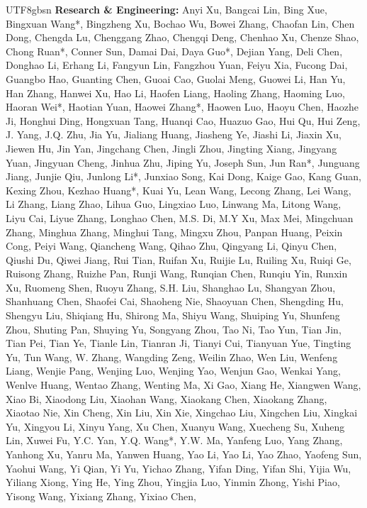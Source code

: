 \documentclass[11pt, a4paper, logo, copyright, nonumbering]{deepseek}
\begin{document}
\begin{CJK*}{UTF8}{gbsn}
\noindent
\textbf{Research \& Engineering:} 
Anyi Xu,
Bangcai Lin,
Bing Xue,
Bingxuan Wang*,
Bingzheng Xu,
Bochao Wu,
Bowei Zhang,
Chaofan Lin,
Chen Dong,
Chengda Lu,
Chenggang Zhao,
Chengqi Deng,
Chenhao Xu,
Chenze Shao,
Chong Ruan*,
Conner Sun,
Damai Dai,
Daya Guo*,
Dejian Yang,
Deli Chen,
Donghao Li,
Erhang Li,
Fangyun Lin,
Fangzhou Yuan,
Feiyu Xia,
Fucong Dai,
Guangbo Hao,
Guanting Chen,
Guoai Cao,
Guolai Meng,
Guowei Li,
Han Yu,
Han Zhang,
Hanwei Xu,
Hao Li,
Haofen Liang,
Haoling Zhang,
Haoming Luo,
Haoran Wei*,
Haotian Yuan,
Haowei Zhang*,
Haowen Luo,
Haoyu Chen,
Haozhe Ji,
Honghui Ding,
Hongxuan Tang,
Huanqi Cao,
Huazuo Gao,
Hui Qu,
Hui Zeng,
J. Yang,
J.Q. Zhu,
Jia Yu,
Jialiang Huang,
Jiasheng Ye,
Jiashi Li,
Jiaxin Xu,
Jiewen Hu,
Jin Yan,
Jingchang Chen,
Jingli Zhou,
Jingting Xiang,
Jingyang Yuan,
Jingyuan Cheng,
Jinhua Zhu,
Jiping Yu,
Joseph Sun,
Jun Ran*,
Junguang Jiang,
Junjie Qiu,
Junlong Li*,
Junxiao Song,
Kai Dong,
Kaige Gao,
Kang Guan,
Kexing Zhou,
Kezhao Huang*,
Kuai Yu,
Lean Wang,
Lecong Zhang,
Lei Wang,
Li Zhang,
Liang Zhao,
Lihua Guo,
Lingxiao Luo,
Linwang Ma,
Litong Wang,
Liyu Cai,
Liyue Zhang,
Longhao Chen,
M.S. Di,
M.Y Xu,
Max Mei,
Mingchuan Zhang,
Minghua Zhang,
Minghui Tang,
Mingxu Zhou,
Panpan Huang,
Peixin Cong,
Peiyi Wang,
Qiancheng Wang,
Qihao Zhu,
Qingyang Li,
Qinyu Chen,
Qiushi Du,
Qiwei Jiang,
Rui Tian,
Ruifan Xu,
Ruijie Lu,
Ruiling Xu,
Ruiqi Ge,
Ruisong Zhang,
Ruizhe Pan,
Runji Wang,
Runqian Chen,
Runqiu Yin,
Runxin Xu,
Ruomeng Shen,
Ruoyu Zhang,
S.H. Liu,
Shanghao Lu,
Shangyan Zhou,
Shanhuang Chen,
Shaofei Cai,
Shaoheng Nie,
Shaoyuan Chen,
Shengding Hu,
Shengyu Liu,
Shiqiang Hu,
Shirong Ma,
Shiyu Wang,
Shuiping Yu,
Shunfeng Zhou,
Shuting Pan,
Shuying Yu,
Songyang Zhou,
Tao Ni,
Tao Yun,
Tian Jin,
Tian Pei,
Tian Ye,
Tianle Lin,
Tianran Ji,
Tianyi Cui,
Tianyuan Yue,
Tingting Yu,
Tun Wang,
W. Zhang,
Wangding Zeng,
Weilin Zhao,
Wen Liu,
Wenfeng Liang,
Wenjie Pang,
Wenjing Luo,
Wenjing Yao,
Wenjun Gao,
Wenkai Yang,
Wenlve Huang,
Wentao Zhang,
Wenting Ma,
Xi Gao,
Xiang He,
Xiangwen Wang,
Xiao Bi,
Xiaodong Liu,
Xiaohan Wang,
Xiaokang Chen,
Xiaokang Zhang,
Xiaotao Nie,
Xin Cheng,
Xin Liu,
Xin Xie,
Xingchao Liu,
Xingchen Liu,
Xingkai Yu,
Xingyou Li,
Xinyu Yang,
Xu Chen,
Xuanyu Wang,
Xuecheng Su,
Xuheng Lin,
Xuwei Fu,
Y.C. Yan,
Y.Q. Wang*,
Y.W. Ma,
Yanfeng Luo,
Yang Zhang,
Yanhong Xu,
Yanru Ma,
Yanwen Huang,
Yao Li,
Yao Li,
Yao Zhao,
Yaofeng Sun,
Yaohui Wang,
Yi Qian,
Yi Yu,
Yichao Zhang,
Yifan Ding,
Yifan Shi,
Yijia Wu,
Yiliang Xiong,
Ying He,
Ying Zhou,
Yingjia Luo,
Yinmin Zhong,
Yishi Piao,
Yisong Wang,
Yixiang Zhang,
Yixiao Chen,

\end{CJK*}
\end{document}
